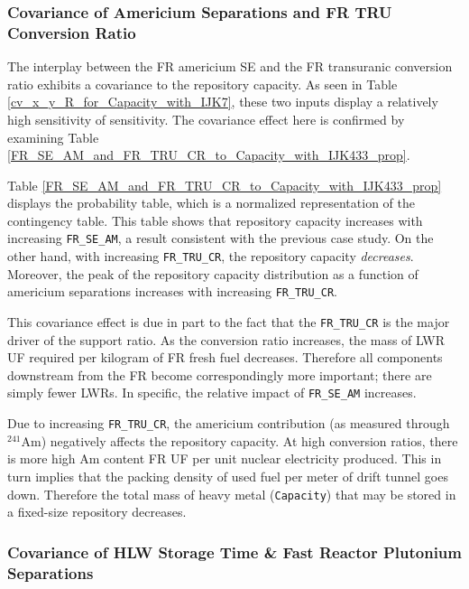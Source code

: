 \documentclass[a4paper, 12pt]{article}
\newcommand{\superscript}[1]{\ensuremath{^{\textrm{#1}}}}
\newcommand{\nuc}[2]{\superscript{#2}{#1}}
\begin{document}
\subsubsection{Covariance of Americium Separations and FR TRU Conversion Ratio}
\label{sec:am_se_fr_tru_cr}

The interplay between the FR americium SE and the FR transuranic conversion ratio exhibits a covariance
to the repository capacity.  As seen in Table \ref{cv_x_y_R_for_Capacity_with_IJK7}, these two inputs display a relatively high sensitivity of sensitivity.  The covariance effect here is confirmed by examining Table \ref{FR_SE_AM_and_FR_TRU_CR_to_Capacity_with_IJK433_prop}.



Table \ref{FR_SE_AM_and_FR_TRU_CR_to_Capacity_with_IJK433_prop} displays the probability table, which is a normalized representation of the contingency table.
This table shows that repository capacity increases with increasing \texttt{FR\_SE\_AM}, a result consistent
with the previous case study.  On the other hand, with increasing \texttt{FR\_TRU\_CR}, the repository capacity \emph{decreases}.  Moreover, the
peak of the repository capacity distribution as a function
of americium separations increases with increasing \texttt{FR\_TRU\_CR}.

This covariance effect is due in part to the fact that the \texttt{FR\_TRU\_CR} is the major driver of the support ratio.  As the conversion ratio
increases, the mass of LWR UF required per kilogram of FR fresh fuel decreases.  Therefore all components downstream from the FR become correspondingly more important;
there are simply fewer LWRs.  In specific, the relative impact of \texttt{FR\_SE\_AM} increases.

Due to increasing \texttt{FR\_TRU\_CR}, the americium contribution (as measured through \nuc{Am}{241}) negatively affects the repository capacity.  At high conversion ratios, there is more high Am content FR UF per unit nuclear electricity produced.  This in turn implies that the
packing density of used fuel per meter of drift tunnel goes down.  Therefore the total mass of heavy metal (\texttt{Capacity}) that may be stored in a
fixed-size repository decreases.


\subsubsection{Covariance of HLW Storage Time \& Fast Reactor Plutonium Separations}
\label{sec:hlw_pu_covariance}
\end{document}
